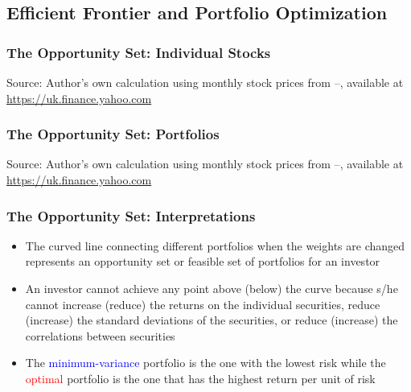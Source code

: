 \documentclass[9pt,aspectratio=169]{beamer}
\begin{document}
\subsection{Efficient Frontier and Portfolio Optimization}

\begin{frame}
\frametitle{\textnormal{The Opportunity Set: Individual Stocks}}

\begin{center}

    

    \tiny {Source: Author's own calculation using monthly stock prices from \LWindowFrom--\LWindowTo, available at \url{https://uk.finance.yahoo.com}  }
\end{center}
\end{frame}

\begin{frame}
\frametitle{\textnormal{The Opportunity Set: Portfolios}}

\begin{center}

    

    \tiny {Source: Author's own calculation using monthly stock prices from \LWindowFrom--\LWindowTo, available at \url{https://uk.finance.yahoo.com  }}
\end{center}

\end{frame}

\begin{frame}
\frametitle{\textnormal{The Opportunity Set: Interpretations}}

\begin{itemize}
    \item The curved line connecting different portfolios when the weights are changed represents an opportunity set or feasible set of portfolios for an investor
 \item An investor cannot achieve any point above (below) the curve because s/he cannot increase (reduce) the returns on the individual securities, reduce (increase) the standard deviations of the securities, or reduce (increase) the correlations between securities
 \item The \textcolor{blue}{minimum-variance} portfolio is the one with the lowest risk while the \textcolor{red}{optimal} portfolio is the one that has the highest return per unit of risk

\end{itemize}
\end{frame}
\end{document}
